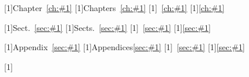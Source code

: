 
[1]{Chapter~\ref{ch:#1}}
[1]{Chapters~\ref{ch:#1}}
[1]{~\ref{ch:#1}}
[1]{\ref{ch:#1}}

[1]{Sect.~\ref{sec:#1}}
[1]{Sects.~\ref{sec:#1}}
[1]{~\ref{sec:#1}}
[1]{\ref{sec:#1}}



[1]{Appendix~\ref{sec:#1}}
[1]{Appendices\ref{sec:#1}}
[1]{~\ref{sec:#1}}
[1]{\ref{sec:#1}}

\nc{\labsec}[1]{\label{sec:#1}}

\providecommand{\path}{./}
\newcommand{\subgraph}[3]{
  \begin{minipage}[t]{1em}\subcaption{}\label{#1}\end{minipage}%
  \hspace{-0.5em}%
  \begin{minipage}[t]{\dimexpr#3\linewidth-0.5em\relax}
  \centering
  \hfill \\[.5em]
  \resizebox{\textwidth}{!}{}%
  \end{minipage}%
}

\newcommand{\subgraphpng}[3]{
  \begin{minipage}[t]{2em}\subcaption{}\label{#1}\end{minipage}%
  \hspace{-2.1em}
  \begin{minipage}[t]{\dimexpr#3\linewidth\relax}
  \centering
  \hfill \\
  \texttt{[image: \\path/fig/\#2]}
  \end{minipage}%
}

\newcommand{\subgrapheps}[4]{
  \begin{minipage}[t]{2em}\subcaption{}\label{#1}\end{minipage}%
  \begin{minipage}[t]{\dimexpr#3\linewidth\relax}
  \centering
  \hfill \\
  \texttt{[image: \\path/fig/\#2]}\hfill\\
  \end{minipage}%
}

\nc{}
